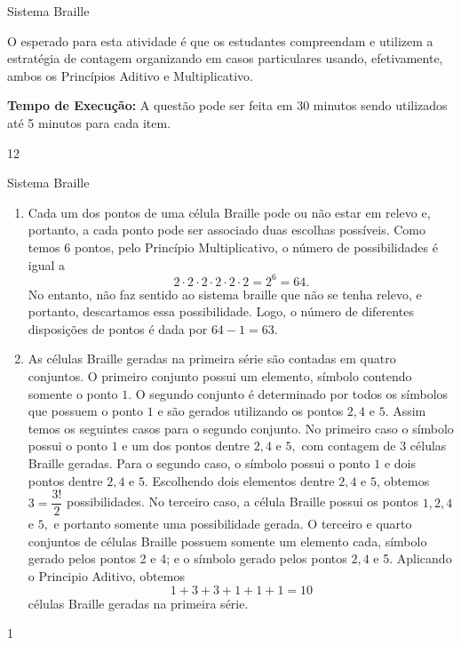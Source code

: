 \clearmargin
\begin{sugestions}{Sistema Braille}
{
O esperado para esta atividade é que os estudantes compreendam e utilizem a  estratégia de contagem  organizando em casos particulares usando, efetivamente, ambos os Princípios Aditivo e Multiplicativo. 

\textbf{Tempo de Execução:} A questão pode ser feita em 30 minutos sendo utilizados até 5  minutos para cada item.
}{1}{2}
\end{sugestions}
\begin{answer}{Sistema Braille}
{
\begin{enumerate}
\item Cada um dos pontos de uma célula Braille pode ou não estar em relevo e, portanto, a cada ponto pode ser associado duas escolhas possíveis. Como temos 6 pontos, pelo Princípio Multiplicativo, o número de possibilidades é igual a $$2 \cdot 2 \cdot 2 \cdot 2 \cdot 2\cdot 2 = 2
^{6}=64.$$ No entanto, não faz sentido ao sistema braille que não  se tenha relevo, e portanto, descartamos essa possibilidade. Logo, o número de diferentes disposições de pontos é dada por $64-1=63.$

\item As células Braille geradas na primeira série são contadas em quatro conjuntos. O primeiro conjunto possui um elemento, símbolo contendo somente o ponto $1.$ O segundo conjunto é determinado por todos os símbolos que possuem o ponto $1$ e são gerados utilizando os pontos $2, 4$ e $5.$
Assim temos os seguintes casos para o segundo conjunto. No primeiro caso o símbolo possui o ponto $1$ e um dos pontos dentre $2,4$ e $5,$ com contagem de $3$ células Braille geradas. Para o segundo caso, o símbolo possui o ponto $1$ e dois pontos dentre $2,4$ e $5.$ Escolhendo dois elementos dentre  $2,4$ e $5$, obtemos $3=\dfrac{3!}{2}$ possibilidades. No terceiro caso, a célula Braille possui os pontos $1,2,4$ e $5,$ e portanto somente uma possibilidade gerada.
O terceiro e quarto conjuntos de células Braille possuem somente um elemento cada, símbolo gerado pelos pontos 2 e 4; e o símbolo gerado pelos pontos $2{,}4$ e 5. Aplicando o Principio Aditivo, obtemos  
$$1+3+3+1+1+1=10$$ 
células Braille geradas na primeira série.\end{enumerate}
}{1}
\end{answer}
